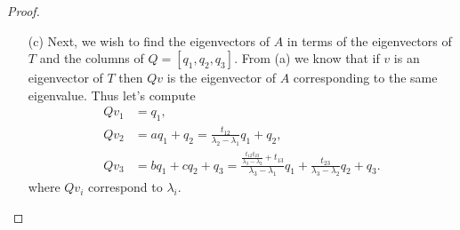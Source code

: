 \documentclass[12pt]{report}
\begin{document}
\begin{problem}
\begin{proof}
\begin{enumerate}
     \item [(c)] 
     Next, we wish to find the eigenvectors of $A$ in terms of the eigenvectors of $T$ and the columns of $Q = [q_1, q_2, q_3]$. From (a) we know that if $v$ is an eigenvector of $T$ then $Qv$ is the eigenvector of $A$ corresponding to the same eigenvalue. Thus let's compute
     \begin{align*}
          Qv_1 &= q_1,\\
          Qv_2 &= aq_1 + q_2 = \frac{t_{12}}{\lambda_2 - \lambda_1}q_1 + q_2,\\
          Qv_3 &= bq_1 + cq_2 + q_3 = \frac{\frac{t_{12}t_{23}}{\lambda_3 - \lambda_2} + t_{13}}{\lambda_3 - \lambda_1}q_1 + \frac{t_{23}}{\lambda_3 - \lambda_2} q_2 + q_3.
     \end{align*}
     where $Qv_i$ correspond to $\lambda_i$. 


\end{enumerate}

\end{proof}
\end{problem}
\end{document}
